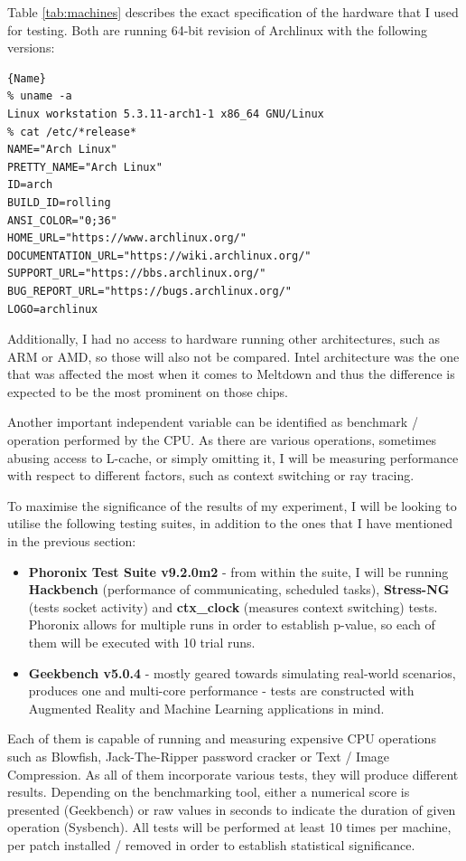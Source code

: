 \documentclass{csfourzero}
\begin{document}
Table \ref{tab:machines} describes the exact specification of the hardware that I used for testing. Both are running 64-bit revision of Archlinux with the following versions: 

\begin{lstlisting}[frame=tlrb, basicstyle=\small]{Name}
% uname -a
Linux workstation 5.3.11-arch1-1 x86_64 GNU/Linux
% cat /etc/*release*
NAME="Arch Linux"
PRETTY_NAME="Arch Linux"
ID=arch
BUILD_ID=rolling
ANSI_COLOR="0;36"
HOME_URL="https://www.archlinux.org/"
DOCUMENTATION_URL="https://wiki.archlinux.org/"
SUPPORT_URL="https://bbs.archlinux.org/"
BUG_REPORT_URL="https://bugs.archlinux.org/"
LOGO=archlinux
\end{lstlisting}

Additionally, I had no access to hardware running other architectures, such as ARM or AMD, so those will also not be compared. Intel architecture was the one that was affected the most when it comes to Meltdown and thus the difference is expected to be the most prominent on those chips.

Another important independent variable can be identified as benchmark / operation performed by the CPU. As there are various operations, sometimes abusing access to L-cache, or simply omitting it, I will be measuring performance with respect to different factors, such as context switching or ray tracing.

To maximise the significance of the results of my experiment, I will be looking to utilise the following testing suites, in addition to the ones that I have mentioned in the previous section:
\begin{itemize}
  \item \textbf{Phoronix Test Suite v9.2.0m2} - from within the suite, I will be running \textbf{Hackbench} (performance of communicating, scheduled tasks), \textbf{Stress-NG} (tests socket activity) and \textbf{ctx\_clock} (measures context switching) tests. Phoronix allows for multiple runs in order to establish p-value, so each of them will be executed with 10 trial runs.
  \item \textbf{Geekbench v5.0.4} - mostly geared towards simulating real-world scenarios, produces one and multi-core performance - tests are constructed with Augmented Reality and Machine Learning applications in mind. \cite{geekbench}
\end{itemize}
Each of them is capable of running and measuring expensive CPU operations such as Blowfish, Jack-The-Ripper password cracker or Text / Image Compression. As all of them incorporate various tests, they will produce different results. Depending on the benchmarking tool, either a numerical score is presented (Geekbench) or raw values in seconds to indicate the duration of given operation (Sysbench). All tests will be performed at least 10 times per machine, per patch installed / removed in order to establish statistical significance. 
\end{document}
